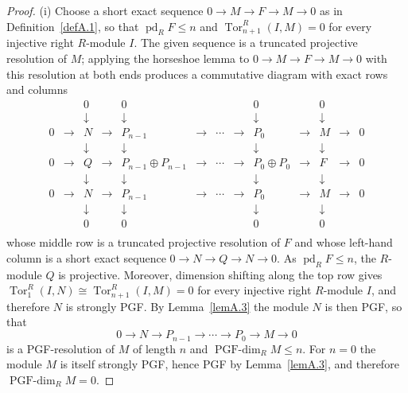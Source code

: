 \documentclass[12pt]{amsart}
\theoremstyle{remark}
\theoremstyle{definition}
\theoremstyle{plain}
\DeclareMathOperator{\pd}{pd}
\DeclareMathOperator{\Tor}{Tor}
\newcommand{\PGFdim}{\operatorname{PGF\text{-}dim}}
\begin{document}
\begin{proof}
(i) Choose a short exact sequence $0\to M\to F\to M\to0$ as in Definition~\ref{defA.1}, so that $\pd_RF\le n$ and $\Tor^R_{n+1}(I,M)=0$ for every injective right $R$-module $I$. The given sequence is a truncated projective resolution of $M$; applying the horseshoe lemma to $0\to M\to F\to M\to0$ with this resolution at both ends produces a commutative diagram with exact rows and columns
\[
\begin{array}{ccccccccccccc}
&   &0& &0& & & &0& &0& & \\&   &\downarrow& &\downarrow& & & &\downarrow& &\downarrow& & \\
0&\to&N&\to&P_{n-1}&\to&\cdots&\to&P_0&\to&M&\to&0\\
 &   &\downarrow& &\downarrow& & & &\downarrow& &\downarrow& & \\
0&\to&Q&\to&P_{n-1}\oplus P_{n-1}&\to&\cdots&\to&P_0\oplus P_0&\to&F&\to&0\\
 &   &\downarrow& &\downarrow& & & &\downarrow& &\downarrow& & \\
0&\to&N&\to&P_{n-1}&\to&\cdots&\to&P_0&\to&M&\to&0\\
&   &\downarrow& &\downarrow& & & &\downarrow& &\downarrow& & \\
&   &0& &0& & & &0& &0& & \\
\end{array}
\]
whose middle row is a truncated projective resolution of $F$ and whose left-hand column is a short exact sequence $0\to N\to Q\to N\to0$. As $\pd_RF\le n$, the $R$-module $Q$ is projective. Moreover, dimension shifting along the top row gives $\Tor^R_1(I,N)\cong\Tor^R_{n+1}(I,M)=0$ for every injective right $R$-module $I$, and therefore $N$ is strongly PGF. By Lemma~\ref{lemA.3} the module $N$ is then PGF, so that $$0\to N\to P_{n-1}\to\cdots\to P_0\to M\to0$$ is a PGF-resolution of $M$ of length $n$ and $\PGFdim_RM\le n$. For $n=0$ the module $M$ is itself strongly PGF, hence PGF by Lemma~\ref{lemA.3}, and therefore $\PGFdim_RM=0$. 


\end{proof}
\end{document}
